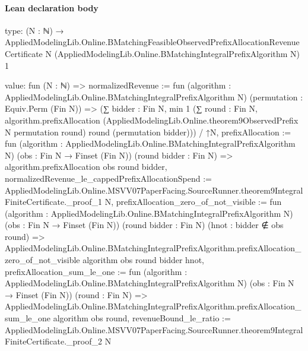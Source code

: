 \documentclass[10pt]{article}
\begin{document}
\paragraph{Lean declaration body}
\begin{ReviewVerbatim}
type:
(N : ℕ) →
  AppliedModelingLib.Online.BMatchingFeasibleObservedPrefixAllocationRevenueCertificate N
    (AppliedModelingLib.Online.BMatchingIntegralPrefixAlgorithm N) 1

value:
fun (N : ℕ) =>
  {
    normalizedRevenue :=
      fun (algorithm : AppliedModelingLib.Online.BMatchingIntegralPrefixAlgorithm N)
        (permutation : Equiv.Perm (Fin N)) =>
      (∑ bidder : Fin N,
          min 1
            (∑ round : Fin N,
              algorithm.prefixAllocation (AppliedModelingLib.Online.theorem9ObservedPrefix N permutation round) round
                (permutation bidder))) /
        ↑N,
    prefixAllocation :=
      fun (algorithm : AppliedModelingLib.Online.BMatchingIntegralPrefixAlgorithm N) (obs : Fin N → Finset (Fin N))
        (round bidder : Fin N) =>
      algorithm.prefixAllocation obs round bidder,
    normalizedRevenue_le_cappedPrefixAllocationSpend :=
      AppliedModelingLib.Online.MSVV07PaperFacing.SourceRunner.theorem9IntegralFiniteCertificate._proof_1 N,
    prefixAllocation_zero_of_not_visible :=
      fun (algorithm : AppliedModelingLib.Online.BMatchingIntegralPrefixAlgorithm N) (obs : Fin N → Finset (Fin N))
        (round bidder : Fin N) (hnot : bidder ∉ obs round) =>
      AppliedModelingLib.Online.BMatchingIntegralPrefixAlgorithm.prefixAllocation_zero_of_not_visible algorithm obs
        round bidder hnot,
    prefixAllocation_sum_le_one :=
      fun (algorithm : AppliedModelingLib.Online.BMatchingIntegralPrefixAlgorithm N) (obs : Fin N → Finset (Fin N))
        (round : Fin N) =>
      AppliedModelingLib.Online.BMatchingIntegralPrefixAlgorithm.prefixAllocation_sum_le_one algorithm obs round,
    revenueBound_le_ratio :=
      AppliedModelingLib.Online.MSVV07PaperFacing.SourceRunner.theorem9IntegralFiniteCertificate._proof_2 N }
\end{ReviewVerbatim}
\end{document}

